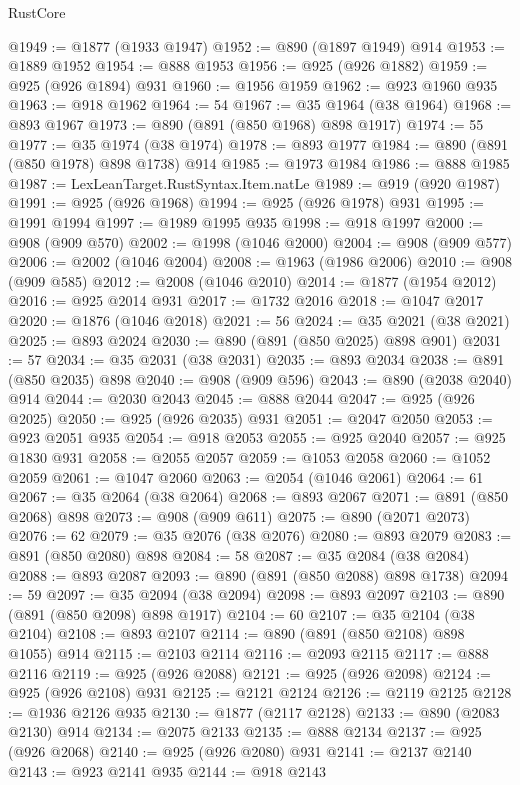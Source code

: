 \begin{lexlean}{RustCore}
\begin{coremodule}
@1949 := @1877 (@1933 @1947)
@1952 := @890 (@1897 @1949) @914
@1953 := @1889 @1952
@1954 := @888 @1953
@1956 := @925 (@926 @1882)
@1959 := @925 (@926 @1894) @931
@1960 := @1956 @1959
@1962 := @923 @1960 @935
@1963 := @918 @1962
@1964 := 54
@1967 := @35 @1964 (@38 @1964)
@1968 := @893 @1967
@1973 := @890 (@891 (@850 @1968) @898 @1917)
@1974 := 55
@1977 := @35 @1974 (@38 @1974)
@1978 := @893 @1977
@1984 := @890 (@891 (@850 @1978) @898 @1738) @914
@1985 := @1973 @1984
@1986 := @888 @1985
@1987 := LexLeanTarget.RustSyntax.Item.natLe
@1989 := @919 (@920 @1987)
@1991 := @925 (@926 @1968)
@1994 := @925 (@926 @1978) @931
@1995 := @1991 @1994
@1997 := @1989 @1995 @935
@1998 := @918 @1997
@2000 := @908 (@909 @570)
@2002 := @1998 (@1046 @2000)
@2004 := @908 (@909 @577)
@2006 := @2002 (@1046 @2004)
@2008 := @1963 (@1986 @2006)
@2010 := @908 (@909 @585)
@2012 := @2008 (@1046 @2010)
@2014 := @1877 (@1954 @2012)
@2016 := @925 @2014 @931
@2017 := @1732 @2016
@2018 := @1047 @2017
@2020 := @1876 (@1046 @2018)
@2021 := 56
@2024 := @35 @2021 (@38 @2021)
@2025 := @893 @2024
@2030 := @890 (@891 (@850 @2025) @898 @901)
@2031 := 57
@2034 := @35 @2031 (@38 @2031)
@2035 := @893 @2034
@2038 := @891 (@850 @2035) @898
@2040 := @908 (@909 @596)
@2043 := @890 (@2038 @2040) @914
@2044 := @2030 @2043
@2045 := @888 @2044
@2047 := @925 (@926 @2025)
@2050 := @925 (@926 @2035) @931
@2051 := @2047 @2050
@2053 := @923 @2051 @935
@2054 := @918 @2053
@2055 := @925 @2040
@2057 := @925 @1830 @931
@2058 := @2055 @2057
@2059 := @1053 @2058
@2060 := @1052 @2059
@2061 := @1047 @2060
@2063 := @2054 (@1046 @2061)
@2064 := 61
@2067 := @35 @2064 (@38 @2064)
@2068 := @893 @2067
@2071 := @891 (@850 @2068) @898
@2073 := @908 (@909 @611)
@2075 := @890 (@2071 @2073)
@2076 := 62
@2079 := @35 @2076 (@38 @2076)
@2080 := @893 @2079
@2083 := @891 (@850 @2080) @898
@2084 := 58
@2087 := @35 @2084 (@38 @2084)
@2088 := @893 @2087
@2093 := @890 (@891 (@850 @2088) @898 @1738)
@2094 := 59
@2097 := @35 @2094 (@38 @2094)
@2098 := @893 @2097
@2103 := @890 (@891 (@850 @2098) @898 @1917)
@2104 := 60
@2107 := @35 @2104 (@38 @2104)
@2108 := @893 @2107
@2114 := @890 (@891 (@850 @2108) @898 @1055) @914
@2115 := @2103 @2114
@2116 := @2093 @2115
@2117 := @888 @2116
@2119 := @925 (@926 @2088)
@2121 := @925 (@926 @2098)
@2124 := @925 (@926 @2108) @931
@2125 := @2121 @2124
@2126 := @2119 @2125
@2128 := @1936 @2126 @935
@2130 := @1877 (@2117 @2128)
@2133 := @890 (@2083 @2130) @914
@2134 := @2075 @2133
@2135 := @888 @2134
@2137 := @925 (@926 @2068)
@2140 := @925 (@926 @2080) @931
@2141 := @2137 @2140
@2143 := @923 @2141 @935
@2144 := @918 @2143

\end{coremodule}
\end{lexlean}
